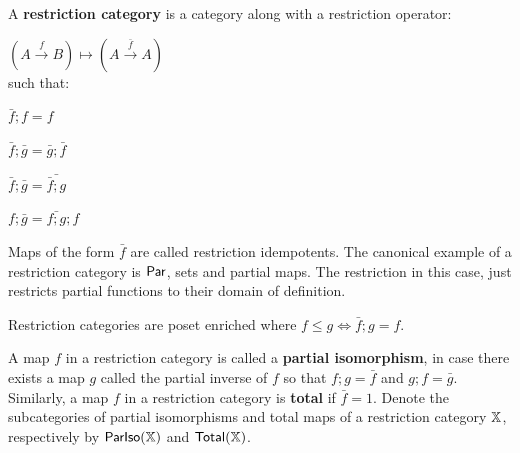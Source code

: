 \begin{definition}\cite[\S 2.1.1]{cockett}
A {\bf restriction category} is a category along with a restriction operator:

\hfil
$
(A \xrightarrow{f} B )\mapsto (A \xrightarrow{\bar f} A)
$\\
such that:

\begin{multicols}{4}
\begin{enumerate}[label={\bf [R.\arabic*]}, ref={\bf [R.\arabic*]}]
\item $\bar f ; f  = f$
\label{R.1}
\item $\bar f ; \bar g = \bar g ; \bar f$
\label{R.2}
\item $\bar f ; \bar g = \bar{\bar f ;  g}$
\label{R.3}
\item $f ; \bar g = \bar{f; g} ; f$
\label{R.4}
\end{enumerate}
\end{multicols}

Maps of the form $\bar f$ are called restriction idempotents.
The canonical example of a restriction category is $\mathsf{Par}$, sets and partial maps.  The restriction in this case, just restricts partial functions to their domain of definition.


Restriction categories are poset enriched where $f \leq g \iff \bar f ; g = f$.


A map $f$ in a restriction category is called a {\bf partial isomorphism}, in case there exists a map $g$ called the partial inverse of $f$ so that $f;g=\bar f$ and $g;f = \bar g$.  Similarly, a map $f$ in a restriction category is {\bf total} if $\bar f =1$.  Denote the subcategories of partial isomorphisms and total maps of a restriction category $\mathbb{X}$, respectively by $\mathsf{ParIso}(\mathbb{X})$ and $\mathsf{Total}(\mathbb{X})$.



\end{definition}

